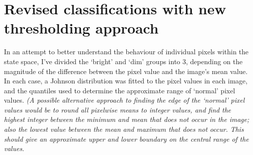 \documentclass[10pt,fleqn]{article}
\begin{document}
\section*{Revised classifications with new thresholding approach}
In an attempt to better understand the behaviour of individual pixels within the state space, I've divided the `bright' and `dim' groups into 3, depending on the magnitude of the difference between the pixel value and the image's mean value. In each case, a Johnson distribution was fitted to the pixel values in each image, and the quantiles used to determine the approximate range of `normal' pixel values. \textit{(A possible alternative approach to finding the edge of the `normal' pixel values would be to round all pixelwise means to integer values, and find the highest integer between the minimum and mean that does not occur in the image; also the lowest value between the mean and maximum that does not occur. This should give an approximate upper and lower boundary on the central range of the values.} 
\end{document}
